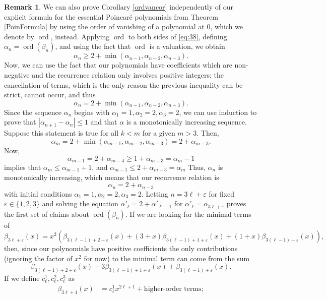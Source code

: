 \documentclass[12pt]{amsart}
\theoremstyle{definition}
\newtheorem{rem}[theorem]{Remark}
\begin{document}
\begin{rem}\label{ordvanprop} We can also prove Corollary \ref{ordvancor} independently of our explicit formula for the essential Poincar\'e polynomials from Theorem \ref{PoinFormula} by using the order of vanishing of a polynomial at $0$, which we denote by $\operatorname{ord}$, instead. Applying $\operatorname{ord}$ to both sides of \eqref{eq:38}, defining $\alpha_n = \operatorname{ord}(\beta_n)$, and using the fact that $\operatorname{ord}$ is a valuation, we obtain \[\alpha_n \geq 2 + \min(\alpha_{n-1},\alpha_{n-2},\alpha_{n-3}).\] Now, we can use the fact that our polynomials have coefficients which are non-negative and the recurrence relation only involves positive integers; the cancellation of terms, which is the only reason the previous inequality can be strict, cannot occur, and thus \[\alpha_n = 2 + \min(\alpha_{n-1},\alpha_{n-2},\alpha_{n-3}).\]
    Since the sequence $\alpha_n$ begins with $\alpha_1=1, \alpha_2 = 2,\alpha_3=2$, we can use induction to prove that $|\alpha_{n+1}-\alpha_n| \leq 1$ and that $\alpha$ is a monotonically increasing sequence. Suppose this statement is true for all $k < m$ for a given $m>3$. Then, 
    \[
    \alpha_m = 2 + \min(\alpha_{m-1},\alpha_{m-2},\alpha_{m-3}) = 2 + \alpha_{m-3}.
    \] Now, \[\alpha_{m-1} = 2+ \alpha_{m-4} \geq 1 + \alpha_{m-3} = \alpha_m -1\] implies that $\alpha_m \leq \alpha_{m-1}+1$, and $\alpha_{m-1}\leq 2 + \alpha_{m-3} = \alpha_m $ Thus, $\alpha_n$ is monotonically increasing, which means that our recurrence relation is \[\alpha_{n} = 2 + \alpha_{n-3}\] with initial conditions $\alpha_1 = 1, \alpha_2=2,\alpha_3 = 2$. Letting $n = 3 \ell + \varepsilon$ for fixed $\varepsilon \in \{1,2,3\}$ and solving the equation $\alpha'_\ell = 2 + \alpha'_{\ell-1}$ for $\alpha'_\ell = \alpha_{3 \ell + \varepsilon}$ proves the first set of claims about $\operatorname{ord}(\beta_n)$. If we are looking for the minimal terms of 
    \[
    \beta_{3\ell + \varepsilon }(x)= x^2(\beta_{3(\ell-1)+2 + \varepsilon}(x) + (3+x) \beta_{3(\ell-1) + 1 + \varepsilon}(x) + (1+x)\beta_{3(\ell-1)+ \varepsilon}(x)),
    \]  
    then, since our polynomials have positive coefficients the only contributions (ignoring the factor of $x^2$ for now) to the minimal term can come from the sum 
    \[
    \beta_{3(\ell-1)+2 + \varepsilon}(x) + 3 \beta_{3( \ell-1)+1 + \varepsilon}(x) + \beta_{3(\ell-1)+\varepsilon}(x).
    \]
    If we define $ c^{1}_\ell, c^{2}_\ell, c^{3}_\ell$ as \begin{align*} 
    \beta_{3\ell+1}(x) &= c^{1}_\ell x^{2\ell+1} + \text{higher-order terms};\\

\end{align*}
\end{rem}
\end{document}
